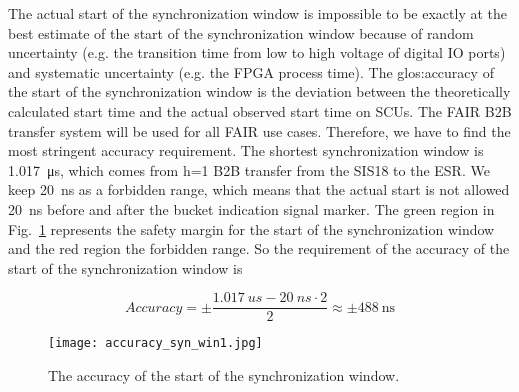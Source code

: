 The actual start of the synchronization window is impossible to be exactly at the best estimate of the start of the synchronization window because of random uncertainty (e.g. the transition time from low to high voltage of digital IO ports) and systematic uncertainty (e.g. the FPGA process time). The \gls{glos:accuracy} of the start of the synchronization window is the deviation between the theoretically calculated start time and the actual observed start time on SCUs. The FAIR B2B transfer system will be used for all FAIR use cases. Therefore, we have to find the most stringent accuracy requirement. The shortest synchronization window is \SI{1.017}{\us}, which comes from h=1 B2B transfer from the SIS18 to the ESR. We keep \SI{20}{ns} as a forbidden range, which means that the actual start is not allowed \SI{20}{\ns} before and after the bucket indication signal marker. The green region in Fig.~\ref{accuracy_syn_win1} represents the safety margin for the start of the synchronization window and the red region the forbidden range. So the requirement of the accuracy of the start of the synchronization window is 

\begin{equation}
Accuracy=\pm\frac{\SI{1.017}{us}-\SI{20}{ns} \cdot 2}{2}\approx \pm \SI{488}{\ns}\label{accu}
\end{equation}

\begin{figure}[!htb]
   \centering   
   \texttt{[image: accuracy\_syn\_win1.jpg]}
   \caption{The accuracy of the start of the synchronization window.}
   \label{accuracy_syn_win1}
\end{figure}




